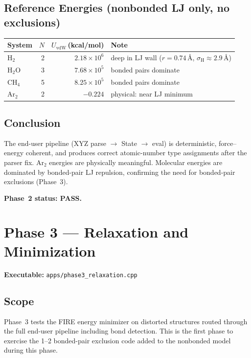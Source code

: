 \documentclass[11pt]{article}
\begin{document}
\subsection{Reference Energies (nonbonded LJ only, no exclusions)}

\begin{center}
\begin{tabular}{lrrl}
\toprule
System & $N$ & $U_{\mathrm{vdW}}$\,(kcal/mol) & Note \\
\midrule
H$_2$   & 2 & $2.18 \times 10^{6}$ & deep in LJ wall ($r = 0.74$\,\AA, $\sigma_\mathrm{H} \approx 2.9$\,\AA) \\
H$_2$O  & 3 & $7.68 \times 10^{5}$ & bonded pairs dominate \\
CH$_4$  & 5 & $8.25 \times 10^{5}$ & bonded pairs dominate \\
Ar$_2$  & 2 & $-0.224$             & physical: near LJ minimum \\
\bottomrule
\end{tabular}
\end{center}

\subsection{Conclusion}

The end-user pipeline (XYZ parse $\to$ State $\to$ eval) is deterministic,
force--energy coherent, and produces correct atomic-number type assignments
after the parser fix.  Ar$_2$ energies are physically meaningful.  Molecular
energies are dominated by bonded-pair LJ repulsion, confirming the need for
bonded-pair exclusions (Phase~3).

\textbf{Phase~2 status: PASS.}

\section{Phase 3 --- Relaxation and Minimization}

\textbf{Executable:} \texttt{apps/phase3\_relaxation.cpp}

\subsection{Scope}

Phase~3 tests the FIRE energy minimizer on distorted structures routed
through the full end-user pipeline including bond detection.  This is the
first phase to exercise the 1--2 bonded-pair exclusion code added to the
nonbonded model during this phase.
\end{document}
